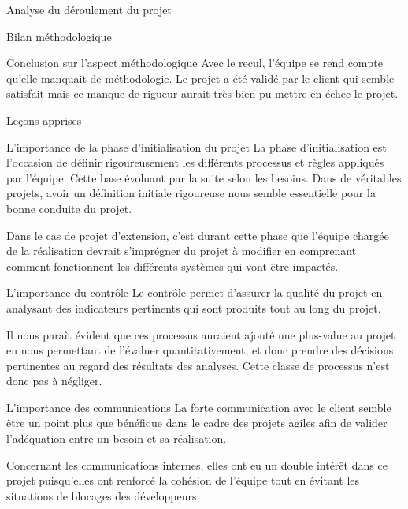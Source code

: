 \documentclass[]{article}
\begin{document}
{\begin{section}{Analyse du déroulement du projet}
\begin{subsection}{Bilan méthodologique}
     \begin{subsubsection}{Conclusion sur l'aspect méthodologique}
        Avec le recul, l'équipe se rend compte qu'elle manquait de méthodologie. Le projet a été validé par le client qui semble satisfait mais ce manque de rigueur aurait très bien pu mettre en échec le projet.
     \end{subsubsection}
 \end{subsection}
\end{section}

\begin{section}{Leçons apprises}
 \begin{subsection}{L'importance de la phase d'initialisation du projet}
     La phase d'initialisation est l'occasion de définir rigoureusement les différents processus et règles appliqués par l'équipe. Cette base évoluant par la suite selon les besoins. Dans de véritables projets, avoir un définition initiale rigoureuse nous semble essentielle pour la bonne conduite du projet.

     Dans le cas de projet d'extension, c'est durant cette phase que l'équipe chargée de la réalisation devrait s'imprégner du projet à modifier en comprenant comment fonctionnent les différents systèmes qui vont être impactés.
 \end{subsection}

 \begin{subsection}{L'importance du contrôle}
     Le contrôle permet d'assurer la qualité du projet en analysant des indicateurs pertinents qui sont produits tout au long du projet.

     Il nous paraît évident que ces processus auraient ajouté une plus-value au projet en nous permettant de l'évaluer quantitativement, et donc prendre des décisions pertinentes au regard des résultats des analyses. Cette classe de processus n'est donc pas à négliger.
 \end{subsection}

 \begin{subsection}{L'importance des communications}
     La forte communication avec le client semble être un point plus que bénéfique dans le cadre des projets agiles afin de valider l'adéquation entre un besoin et sa réalisation. 

     Concernant les communications internes, elles ont eu un double intérêt dans ce projet puisqu'elles ont renforcé la cohésion de l'équipe tout en évitant les situations de blocages des développeurs.
 \end{subsection}
\end{section}

}
\end{document}
